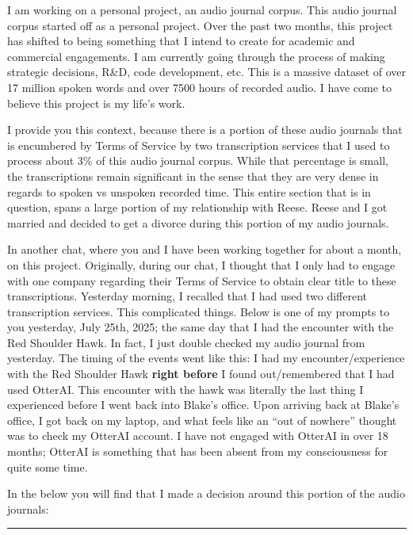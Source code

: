 \documentclass{article}
\begin{document}
I am working on a personal project, an audio journal corpus. This audio journal corpus started off as a personal project. Over the past two months, this project has shifted to being something that I intend to create for academic and commercial engagements. I am currently going through the process of making strategic decisions, R\&D, code development, etc. This is a massive dataset of over 17 million spoken words and over 7500 hours of recorded audio. I have come to believe this project is my life's work.

I provide you this context, because there is a portion of these audio journals that is encumbered by Terms of Service by two transcription services that I used to process about 3\% of this audio journal corpus. While that percentage is small, the transcriptions remain significant in the sense that they are very dense in regards to spoken vs unspoken recorded time. This entire section that is in question, spans a large portion of my relationship with Reese. Reese and I got married and decided to get a divorce during this portion of my audio journals.

In another chat, where you and I have been working together for about a month, on this project. Originally, during our chat, I thought that I only had to engage with one company regarding their Terms of Service to obtain clear title to these transcriptions. Yesterday morning, I recalled that I had used two different transcription services. This complicated things. Below is one of my prompts to you yesterday, July 25th, 2025; the same day that I had the encounter with the Red Shoulder Hawk. In fact, I just double checked my audio journal from yesterday. The timing of the events went like this: I had my encounter/experience with the Red Shoulder Hawk \textbf{right before} I found out/remembered that I had used OtterAI. This encounter with the hawk was literally the last thing I experienced before I went back into Blake's office. Upon arriving back at Blake's office, I got back on my laptop, and what feels like an ``out of nowhere'' thought was to check my OtterAI account. I have not engaged with OtterAI in over 18 months; OtterAI is something that has been absent from my consciousness for quite some time.

In the below you will find that I made a decision around this portion of the audio journals:

\begin{center}\rule{0.5\linewidth}{0.5pt}\end{center}
\end{document}
